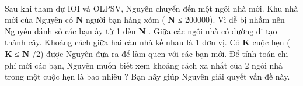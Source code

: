  

Sau khi tham dự IOI và OLPSV, Nguyên chuyển đến một ngôi nhà mới. Khu nhà mới của Nguyên có \textbf{ N } người bạn hàng xóm ( \textbf{ N } ≤ 200000). Vì dễ bị nhầm nên Nguyên đánh số các bạn ấy từ 1 đến \textbf{ N } . Giữa các ngôi nhà có đường đi tạo thành cây. Khoảng cách giữa hai căn nhà kề nhau là 1 đơn vị. Có \textbf{ K } cuộc hẹn ( \textbf{ K } ≤ \textbf{ N } /2) được Nguyên đưa ra để làm quen với các bạn mới. Để tính toán chi phí mời các bạn, Nguyên muốn biết xem khoảng cách xa nhất của 2 ngôi nhà trong một cuộc hẹn là bao nhiêu ? Bạn hãy giúp Nguyên giải quyết vấn đề này.